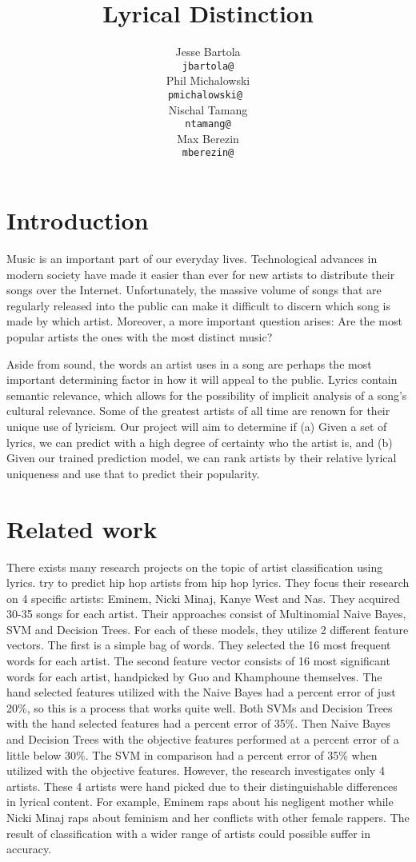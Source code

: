 \documentclass[11pt,a4paper]{article}
\title{Lyrical Distinction}
\author{Jesse Bartola \\
  {\tt jbartola@} \\\And
  Phil Michalowski \\
  {\tt pmichalowski@ } \\\And
  Nischal Tamang \\
  {\tt ntamang@} \\\And
  Max Berezin \\
  {\tt mberezin@} \\}
\date{}
\begin{document}
\maketitle

\section{Introduction}
Music is an important part of our everyday lives. Technological advances in modern society have made it easier than ever for new artists to distribute their songs over the Internet. Unfortunately, the massive volume of songs that are regularly released into the public can make it difficult to discern which song is made by which artist. Moreover, a more important question arises: Are the most popular artists the ones with the most distinct music?

Aside from sound, the words an artist uses in a song are perhaps the most important determining factor in how it will appeal to the public. 
Lyrics contain semantic relevance, which allows for the possibility of implicit analysis of a song's cultural relevance. 
Some of the greatest artists of all time are renown for their unique use of lyricism. Our project will aim to determine if (a) Given a set of lyrics, we can predict with a high degree of certainty who the artist is, and (b) Given our trained prediction model, we can rank artists by their relative lyrical uniqueness and use that to predict their popularity.


\section{Related work}
There exists many research projects on the topic of artist classification using lyrics.  try to predict hip hop artists from hip hop lyrics. They focus their research on 4 specific artists: Eminem, Nicki Minaj, Kanye West and Nas. They acquired 30-35 songs for each artist.
Their approaches consist of Multinomial Naive Bayes, SVM and Decision Trees.
For each of these models, they utilize 2 different feature vectors. The first is a simple bag of words. They selected the 16 most frequent words for each artist. The second feature vector consists of 16 most significant words for each artist, handpicked by Guo and Khamphoune themselves.
The hand selected features utilized with the Naive Bayes had a percent error of just 20\%, so this is a process that works quite well. Both SVMs and Decision Trees with the hand selected features had a percent error of 35\%. Then Naive Bayes and Decision Trees with the objective features performed at a percent error of a little below 30\%. The SVM in comparison had a percent error of 35\% when utilized with the objective features.
However, the research investigates only 4 artists. These 4 artists were hand picked due to their distinguishable differences in lyrical content. For example, Eminem raps about his negligent mother while Nicki Minaj raps about feminism and her conflicts with other female rappers. The result of classification with a wider range of artists could possible suffer in accuracy. 
\end{document}
